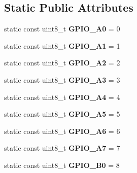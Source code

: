 \subsection*{Static Public Attributes}
\begin{DoxyCompactItemize}
\item 
\hypertarget{classMCP23S17_a759ef1c2480227759d5b5ea05ffecce0}{static const uint8\-\_\-t {\bfseries G\-P\-I\-O\-\_\-\-A0} = 0}\label{classMCP23S17_a759ef1c2480227759d5b5ea05ffecce0}

\item 
\hypertarget{classMCP23S17_a334689a00aeeae7947eaff662dee942a}{static const uint8\-\_\-t {\bfseries G\-P\-I\-O\-\_\-\-A1} = 1}\label{classMCP23S17_a334689a00aeeae7947eaff662dee942a}

\item 
\hypertarget{classMCP23S17_ab1ee881157292443cbf8eb0f33d1418b}{static const uint8\-\_\-t {\bfseries G\-P\-I\-O\-\_\-\-A2} = 2}\label{classMCP23S17_ab1ee881157292443cbf8eb0f33d1418b}

\item 
\hypertarget{classMCP23S17_a16df8b0338dd0568ee7bf4683ce8b1fd}{static const uint8\-\_\-t {\bfseries G\-P\-I\-O\-\_\-\-A3} = 3}\label{classMCP23S17_a16df8b0338dd0568ee7bf4683ce8b1fd}

\item 
\hypertarget{classMCP23S17_a9b8d7dd871b10ad7100d39e5b2267bc7}{static const uint8\-\_\-t {\bfseries G\-P\-I\-O\-\_\-\-A4} = 4}\label{classMCP23S17_a9b8d7dd871b10ad7100d39e5b2267bc7}

\item 
\hypertarget{classMCP23S17_a28af569b31d638738a26c42de4d17ea0}{static const uint8\-\_\-t {\bfseries G\-P\-I\-O\-\_\-\-A5} = 5}\label{classMCP23S17_a28af569b31d638738a26c42de4d17ea0}

\item 
\hypertarget{classMCP23S17_ae3d3c04d465f7a876adbe2857f2858be}{static const uint8\-\_\-t {\bfseries G\-P\-I\-O\-\_\-\-A6} = 6}\label{classMCP23S17_ae3d3c04d465f7a876adbe2857f2858be}

\item 
\hypertarget{classMCP23S17_a7bd98b1d3749547b98b40580fe019f54}{static const uint8\-\_\-t {\bfseries G\-P\-I\-O\-\_\-\-A7} = 7}\label{classMCP23S17_a7bd98b1d3749547b98b40580fe019f54}

\item 
\hypertarget{classMCP23S17_af6f1bce620edac01e8dfdca481e32699}{static const uint8\-\_\-t {\bfseries G\-P\-I\-O\-\_\-\-B0} = 8}\label{classMCP23S17_af6f1bce620edac01e8dfdca481e32699}


\end{DoxyCompactItemize}
